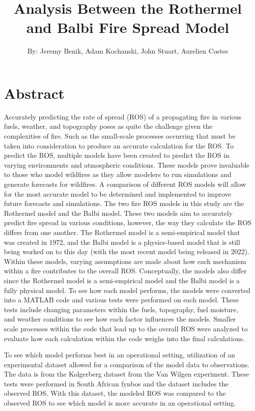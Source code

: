 \documentclass{article}
\begin{document}
\title{Analysis Between the Rothermel and Balbi Fire Spread Model}
\author{By: Jeremy Benik, Adam Kochanski, John Stuart, Aurelien Costes}
\maketitle
\section{Abstract}
Accurately predicting the rate of spread (ROS) of a propagating fire in various fuels, weather, and topography poses as quite the challenge given the complexities of fire. Such as the small-scale processes occurring that must be taken into consideration to produce an accurate calculation for the ROS. To predict the ROS, multiple models have been created to predict the ROS in varying environments and atmospheric conditions.
These models prove invaluable to those who model wildfires as they allow modelers to run simulations and generate forecasts for wildfires. A comparison of different ROS models will allow for the most accurate model to be determined and implemented to improve future forecasts and simulations. The two fire ROS models in this study are the Rothermel model and the Balbi model. These two models aim to accurately predict fire spread in various conditions, however, the way they calculate the ROS differs from one another. The Rothermel model is a semi-empirical model that was created in 1972, and the Balbi model is a physics-based model that is still being worked on to this day (with the most recent model being released in 2022). Within these models, varying assumptions are made about how each mechanism within a fire contributes to the overall ROS. Conceptually, the models also differ since the Rothermel model is a semi-empirical model and the Balbi model is a fully physical model. To see how each model performs, the models were converted into a MATLAB code and various tests were performed on each model. These tests include changing parameters within the fuels, topography, fuel moisture, and weather conditions to see how each factor influences the models. Smaller scale processes within the code that lead up to the overall ROS were analyzed to evaluate how each calculation within the code weighs into the final calculations.

To see which model performs best in an operational setting, utilization of an experimental dataset allowed for a comparison of the model data to observations. The data is from the Kolgerberg dataset from the Van Wilgen experiment. These tests were performed in South African fynbos and the dataset includes the observed ROS. With this dataset, the modeled ROS was compared to the observed ROS to see which model is more accurate in an operational setting.
\end{document}
